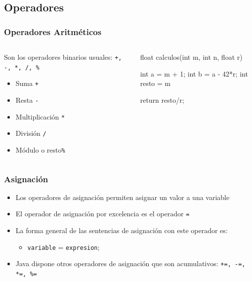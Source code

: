 \documentclass{beamer}
\begin{document}
 \subsection{Operadores}

\begin{frame}[fragile]
  \frametitle{Operadores Aritméticos} 

  \begin{columns}
    \begin{column}{0.5\textwidth}
      Son los operadores binarios usuales: \texttt{+, -, *, /, \%}
      \begin{itemize}
      \item Suma \texttt{+}        
      \item Resta \texttt{-}        
      \item Multiplicación \texttt{*}        
      \item División \texttt{/}        
      \item Módulo o resto\texttt{\%}
      \end{itemize}
    \end{column}
    \begin{column}{0.5\textwidth}
      \begin{jsmall}
        float calculos(int m, int n, float r) {
          int a = m + 1;
          int b = a - 42*r;
          int resto = m %
          
          return resto/r;
        }        
      \end{jsmall}      
    \end{column}
  \end{columns}
\end{frame}

\begin{frame}
  \frametitle{Asignación} 
  \begin{itemize}
  \item Los operadores de asignación permiten asignar un valor a una variable
  \item El operador de asignación por excelencia es el operador
    \texttt{=}
  \item La forma general de las sentencias de asignación con este operador es:
    \begin{itemize}
    \item \texttt{variable} = \texttt{expresion};
    \end{itemize}
  \item Java dispone otros operadores de asignación que son
    acumulativos: \texttt{+=, -=, *=, \%=}
  \end{itemize}
\end{frame}
\end{document}
